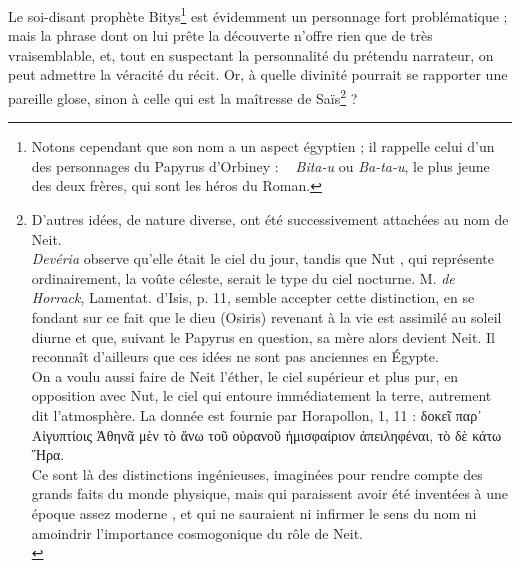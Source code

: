 \documentclass[a4paper, 11pt, oneside]{article}
\newcommand*\hieroAADM{}
\newcommand*\hieroAADT{}
\newcommand*\hieroABGF{}
\newcommand*\hieroABIQ{\raisebox{0.5ex}{}}
\begin{document}
Le soi-disant prophète Bitys\footnote{Notons cependant que son nom a un aspect égyptien ; il rappelle celui d'un des personnages du Papyrus d'Orbiney : $\hieroAADM\:\hieroABIQ\:\hieroAADT$ \emph{Bita-u} ou \emph{Ba-ta-u}, le plus jeune des deux frères, qui sont les héros du Roman.} est évidemment un personnage fort problématique ; mais la phrase dont on lui prête la découverte n'offre rien que de très vraisemblable, et, tout en suspectant la personnalité du prétendu narrateur, on peut admettre la véracité du récit. Or, à quelle divinité pourrait se rapporter une pareille glose, sinon à celle qui est la maîtresse de Saïs\footnote{D'autres idées, de nature diverse, ont été successivement attachées au nom de Neit.\\\hspace*{5mm}\emph{Devéria} observe qu'elle était le ciel du jour, tandis que Nut $\hieroABGF$, qui représente ordinairement, la voûte céleste, serait le type du ciel nocturne. M. \emph{de Horrack}, Lamentat. d'Isis, p. 11, semble accepter cette distinction, en se fondant sur ce fait que le dieu (Osiris) revenant à la vie est assimilé au soleil diurne et que, suivant le Papyrus en question, sa mère alors devient Neit. Il reconnaît d'ailleurs que ces idées ne sont pas anciennes en Égypte.\\\hspace*{5mm}On a voulu aussi faire de Neit l'éther, le ciel supérieur et plus pur, en opposition avec Nut, le ciel qui entoure immédiatement la terre, autrement dit l'atmosphère. La donnée est fournie par Horapollon, 1, 11 : δοκεῖ παρ᾿ Αἰγυπτίοις Ἀθηνᾶ μὲν τὸ ἄνω τοῦ οὐρανοῦ ἡμισφαίριον ἀπειληφέναι, τὸ δὲ κάτω Ἥρα.\\\hspace*{5mm}Ce sont là des distinctions ingénieuses, imaginées pour rendre compte des grands faits du monde physique, mais qui paraissent avoir été inventées à une époque assez moderne , et qui ne sauraient ni infirmer le sens du nom ni amoindrir l'importance cosmogonique du rôle de Neit.\\\hspace*{5mm}} ?
\end{document}
